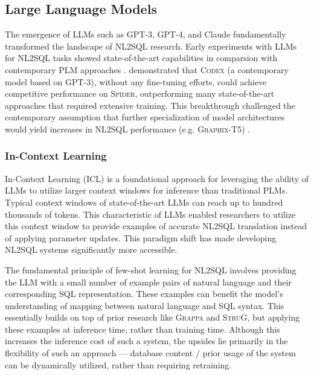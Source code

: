 \subsection{Large Language Models}

The emergence of LLMs such as GPT-3, GPT-4, and Claude fundamentally transformed the landscape of NL2SQL research. Early 
experiments with LLMs for NL2SQL tasks showed state-of-the-art capabilities in comparsion with contemporary PLM approaches 
\citep{DAIL-SQL}. \cite{T2SQL-LLM-Bench-3} demonstrated that \textsc{Codex} (a contemporary model based on GPT-3), without any 
fine-tuning efforts, could achieve competitive performance on \textsc{Spider}, outperforming many state-of-the-art approaches that 
required extensive training. This breakthrough challenged the contemporary assumption that further specialization of model 
architectures would yield increases in NL2SQL performance (e.g. \textsc{Graphix-T5}) \citep{GRAPHIX}.

\subsubsection{In-Context Learning}

In-Context Learning (ICL) is a foundational approach for leveraging the ability of LLMs to utilize larger context windows for
inference than traditional PLMs. Typical context windows of state-of-the-art LLMs can reach up to hundred thousands of tokens.
This characteristic of LLMs enabled researchers to utilize this context window to provide examples of accurate NL2SQL translation
instead of applying parameter updates. This paradigm shift has made developing NL2SQL systems significantly more accessible.

The fundamental principle of few-shot learning for NL2SQL involves providing the LLM with a small number of example pairs
of natural language and their corresponding SQL representation. These examples can benefit the model's understanding of
mapping between natural language and SQL syntax. This essentially builds on top of prior research like \textsc{Grappa}
and \textsc{StruG}, but applying these examples at inference time, rather than training time. Although this increases
the inference cost of such a system, the upsides lie primarily in the flexibility of such an approach — database content
/ prior usage of the system can be dynamically utilized, rather than requiring retraining.

